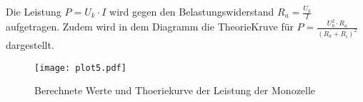 Die Leistung $P=U_k \cdot I$ wird gegen den Belastungswiderstand $R_a = \frac{U_k}{I}$ aufgetragen. Zudem wird in dem
Diagramm die TheorieKruve für $P = \frac{U_0^2 \cdot R_a}{(R_a + R_i)^2}$ dargestellt.

\begin{figure}[H]
  \centering
  \texttt{[image: plot5.pdf]}
  \caption{Berechnete Werte und Thoeriekurve der Leistung der Monozelle}
  \label{fig:plot5}
\end{figure}
